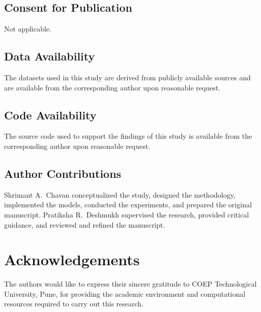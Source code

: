 \documentclass[sn-nature]{sn-jnl}
\begin{document}
\subsection*{Consent for Publication}
Not applicable.

\subsection*{Data Availability}
The datasets used in this study are derived from publicly available sources and are available from the corresponding author upon reasonable request.

\subsection*{Code Availability}
The source code used to support the findings of this study is available from the corresponding author upon reasonable request.

\subsection*{Author Contributions}
Shrimant A.\ Chavan conceptualized the study, designed the methodology, implemented the models, conducted the experiments, and prepared the original manuscript.
Pratiksha R.\ Deshmukh supervised the research, provided critical guidance, and reviewed and refined the manuscript.

\section*{Acknowledgements}
The authors would like to express their sincere gratitude to COEP Technological University, Pune, for providing the academic environment and computational resources required to carry out this research.


\end{document}
